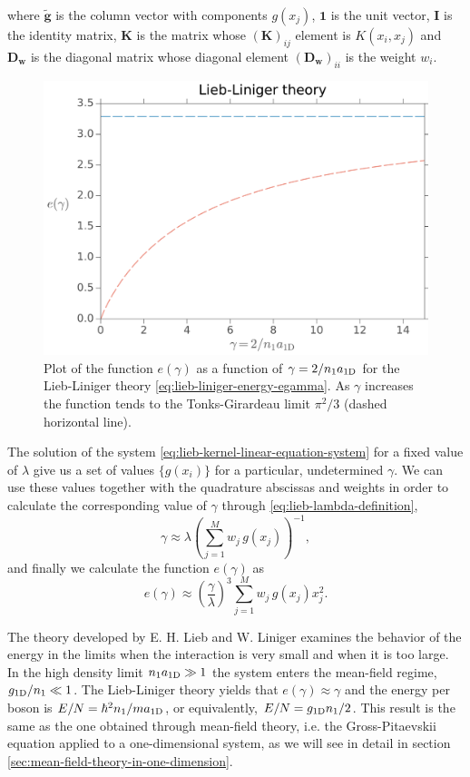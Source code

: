 %
where $\mathbf{\tilde g}$ is the column vector with components $g(x_j)$,
$\mathbf{1}$ is the unit vector, $\mathbf{I}$ is the identity matrix,
$\mathbf{K}$ is the matrix whose $(\mathbf{K})_{ij}$ element is $K(x_i, x_j)$
and $\mathbf{D_w}$ is the diagonal matrix whose diagonal element
$(\mathbf{D_w})_{ii}$ is the weight $w_i$.
%
\begin{figure}[t!]
	\centering
	\includegraphics[width=0.85\linewidth]{./figures/lieb-liniger-theory_energy-as-gamma}
	\caption{ Plot of the function $e(\gamma)$ as a function of $\gamma = 2 /
			{{n}_1} a_{ \mathrm{1D} }$ for the Lieb-Liniger theory
		\eqref{eq:lieb-liniger-energy-egamma}. As $\gamma$ increases the function
		tends to the Tonks-Girardeau limit $\pi^2/3$ (dashed horizontal line). }
	\label{fig:lieb-liniger-theory-energy-as-gamma}
\end{figure}
%
The solution of the system \eqref{eq:lieb-kernel-linear-equation-system} for a
fixed value of $\lambda$ give us a set of values $\{ g(x_i) \}$ for a
particular, undetermined $\gamma$. We can use these values together with the
quadrature abscissas and weights in order to calculate the corresponding value
of $\gamma$ through \eqref{eq:lieb-lambda-definition},
%
\begin{equation}
	\gamma \approx \lambda \left( \sum_{j=1}^{M} w_j \, g(x_j) \right)^{-1},
\end{equation}
%
and finally we calculate the function $e(\gamma)$ as
%
\begin{equation}
	e(\gamma) \approx \left(\frac{\gamma}{\lambda}\right)^3 \sum_{j=1}^{M} w_j \, g(x_j) x_j^2.
\end{equation}

The theory developed by E. H. Lieb and W. Liniger
\cite{bib:lieb-phys-rev.130.1605.1963} examines the behavior of the energy in
the limits when the interaction is very small and when it is too large. In the
high density limit ${{n}_1} a_{ \mathrm{1D} } \gg 1$ the system enters  the
mean-field regime, $g_{ \mathrm{1D} } / {{n}_1} \ll 1$. The Lieb-Liniger theory
yields that $e(\gamma) \approx \gamma$ and the energy per boson is $E/N =
	\hbar^2 {{n}_1} / m a_{ \mathrm{1D} }$, or equivalently, $E/N = g_{ \mathrm{1D} } {{n}_1}
	/ 2$. This result is the same as the one obtained through mean-field theory,
i.e. the Gross-Pitaevskii equation applied to a one-dimensional system, as we
will see in detail in section \ref{sec:mean-field-theory-in-one-dimension}.

